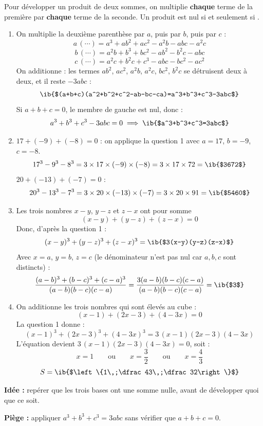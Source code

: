\begin{prop}[Développement]
Pour développer un produit de deux sommes, on multiplie \textbf{chaque} terme de la première par \textbf{chaque} terme de la seconde. Un produit est nul si et seulement si .
\end{prop}
\begin{enumerate}
  \item On multiplie la deuxième parenthèse par $a$, puis par $b$, puis par $c$ :
  \[a\,(\cdots)=a^3+ab^2+ac^2-a^2b-abc-a^2c\]
  \[b\,(\cdots)=a^2b+b^3+bc^2-ab^2-b^2c-abc\]
  \[c\,(\cdots)=a^2c+b^2c+c^3-abc-bc^2-ac^2\]
  On additionne : les termes $ab^2$, $ac^2$, $a^2b$, $a^2c$, $bc^2$, $b^2c$ se détruisent deux à deux, et il reste $-3abc$ :
  \[\ib{$(a+b+c)(a^2+b^2+c^2-ab-bc-ca)=a^3+b^3+c^3-3abc$}\]
  Si $a+b+c=0$, le membre de gauche est nul, donc :
  \[a^3+b^3+c^3-3abc=0\implies\ib{$a^3+b^3+c^3=3abc$}\]

  \item $17+(-9)+(-8)=0$ : on applique la question 1 avec $a=17$, $b=-9$, $c=-8$.
  \[17^3-9^3-8^3=3\times17\times(-9)\times(-8)=3\times17\times72=\ib{$3672$}\]
  $20+(-13)+(-7)=0$ :
  \[20^3-13^3-7^3=3\times20\times(-13)\times(-7)=3\times20\times91=\ib{$5460$}\]

  \item Les trois nombres $x-y$, $y-z$ et $z-x$ ont pour somme
  \[(x-y)+(y-z)+(z-x)=0\]
  Donc, d'après la question 1 :
  \[(x-y)^3+(y-z)^3+(z-x)^3=\ib{$3(x-y)(y-z)(z-x)$}\]
  Avec $x=a$, $y=b$, $z=c$ (le dénominateur n'est pas nul car $a,b,c$ sont distincts) :
  \[\dfrac{(a-b)^3+(b-c)^3+(c-a)^3}{(a-b)(b-c)(c-a)}=\dfrac{3(a-b)(b-c)(c-a)}{(a-b)(b-c)(c-a)}=\ib{$3$}\]

  \item On additionne les trois nombres qui sont élevés au cube :
  \[(x-1)+(2x-3)+(4-3x)=0\]
  La question 1 donne :
  \[(x-1)^3+(2x-3)^3+(4-3x)^3=3\,(x-1)(2x-3)(4-3x)\]
  L'équation devient $3\,(x-1)(2x-3)(4-3x)=0$, soit :
  \[x=1\qquad\text{ou}\qquad x=\dfrac32\qquad\text{ou}\qquad x=\dfrac43\]
  \[S=\ib{$\left\{1\,;\dfrac43\,;\dfrac32\right\}$}\]
\end{enumerate}
\textbf{Idée :} repérer que les trois bases ont une somme nulle, avant de développer quoi que ce soit.

\textbf{Piège :} appliquer $a^3+b^3+c^3=3abc$ sans vérifier que $a+b+c=0$.
